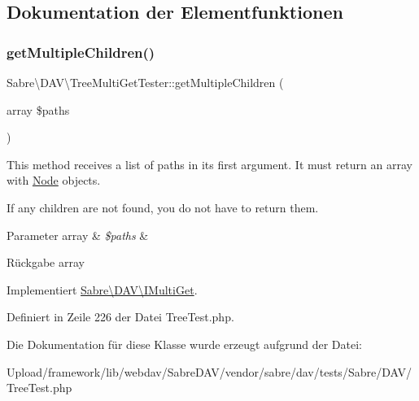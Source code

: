 \subsection{Dokumentation der Elementfunktionen}
\mbox{\label{class_sabre_1_1_d_a_v_1_1_tree_multi_get_tester_a41fc2b413304bdfa1bdb6924689ca616}} 
\subsubsection{\texorpdfstring{get\+Multiple\+Children()}{getMultipleChildren()}}
{\footnotesize\ttfamily Sabre\textbackslash{}\+D\+A\+V\textbackslash{}\+Tree\+Multi\+Get\+Tester\+::get\+Multiple\+Children (\begin{DoxyParamCaption}\item[{array}]{\$paths }\end{DoxyParamCaption})}

This method receives a list of paths in it\textquotesingle{}s first argument. It must return an array with \mbox{\hyperlink{class_sabre_1_1_d_a_v_1_1_node}{Node}} objects.

If any children are not found, you do not have to return them.


\begin{DoxyParams}[1]{Parameter}
array & {\em \$paths} & \\
\hline
\end{DoxyParams}
\begin{DoxyReturn}{Rückgabe}
array 
\end{DoxyReturn}


Implementiert \mbox{\hyperlink{interface_sabre_1_1_d_a_v_1_1_i_multi_get_a4d66db5c26d9247511687cd277799528}{Sabre\textbackslash{}\+D\+A\+V\textbackslash{}\+I\+Multi\+Get}}.



Definiert in Zeile 226 der Datei Tree\+Test.\+php.



Die Dokumentation für diese Klasse wurde erzeugt aufgrund der Datei\+:\begin{DoxyCompactItemize}
\item 
Upload/framework/lib/webdav/\+Sabre\+D\+A\+V/vendor/sabre/dav/tests/\+Sabre/\+D\+A\+V/Tree\+Test.\+php\end{DoxyCompactItemize}
